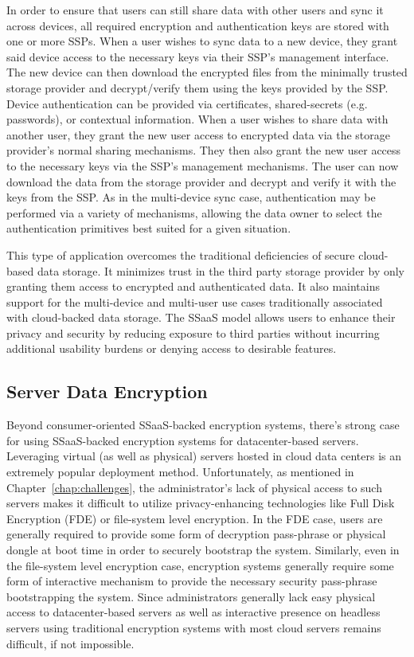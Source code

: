 In order to ensure that users can still share data with other users
and sync it across devices, all required encryption and authentication
keys are stored with one or more SSPs. When a user wishes to sync data
to a new device, they grant said device access to the necessary keys
via their SSP's management interface. The new device can then download
the encrypted files from the minimally trusted storage provider and
decrypt/verify them using the keys provided by the SSP. Device
authentication can be provided via certificates, shared-secrets
(e.g. passwords), or contextual information. When a user wishes to
share data with another user, they grant the new user access to
encrypted data via the storage provider's normal sharing
mechanisms. They then also grant the new user access to the necessary
keys via the SSP's management mechanisms. The user can now download
the data from the storage provider and decrypt and verify it with the
keys from the SSP. As in the multi-device sync case, authentication
may be performed via a variety of mechanisms, allowing the data owner
to select the authentication primitives best suited for a given
situation.

This type of application overcomes the traditional deficiencies of
secure cloud-based data storage. It minimizes trust in the third party
storage provider by only granting them access to encrypted and
authenticated data. It also maintains support for the multi-device and
multi-user use cases traditionally associated with cloud-backed data
storage. The SSaaS model allows users to enhance their privacy and
security by reducing exposure to third parties without incurring
additional usability burdens or denying access to desirable features.

\subsection{Server Data Encryption}

Beyond consumer-oriented SSaaS-backed encryption systems, there's
strong case for using SSaaS-backed encryption systems for
datacenter-based servers. Leveraging virtual (as well as physical)
servers hosted in cloud data centers is an extremely popular
deployment method. Unfortunately, as mentioned in
Chapter~\ref{chap:challenges}, the administrator's lack of physical
access to such servers makes it difficult to utilize privacy-enhancing
technologies like Full Disk Encryption (FDE) or file-system level
encryption. In the FDE case, users are generally required to provide
some form of decryption pass-phrase or physical dongle at boot time in
order to securely bootstrap the system. Similarly, even in the
file-system level encryption case, encryption systems generally
require some form of interactive mechanism to provide the necessary
security pass-phrase bootstrapping the system. Since administrators
generally lack easy physical access to datacenter-based servers as
well as interactive presence on headless servers using traditional
encryption systems with most cloud servers remains difficult, if not
impossible.

